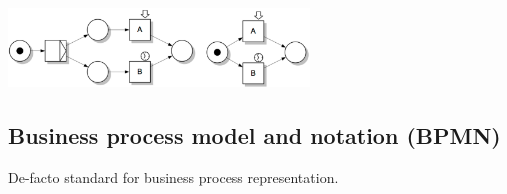 \begin{example}
    \begin{center}
        \includegraphics[width=0.6\textwidth]{img/workflow_nets_example1.png}
    \end{center}
\end{example}



\subsection{Business process model and notation (BPMN)}
De-facto standard for business process representation.

